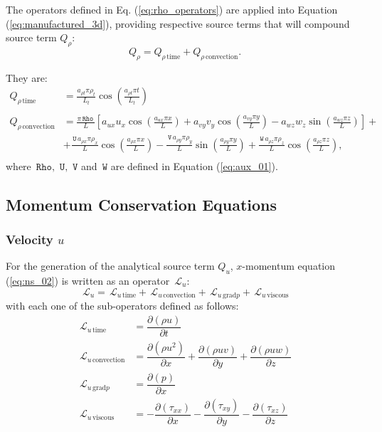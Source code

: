 \documentclass[10pt]{article}
\newcommand{\Diff}[2] {\dfrac{\partial( #1)}{\partial #2}}
\newcommand{\Rho}{\,\mathtt{Rho}}
\newcommand{\U}{\,\mathtt{U}}
\newcommand{\V}{\,\mathtt{V}}
\newcommand{\W}{\,\mathtt{W}}
\newcommand{\Lo}{\,\mathcal{L}}
\newcommand{\convection}{\text{convection}}
\newcommand{\gradp}{\text{grad}p}
\newcommand{\viscous}{\text{viscous}}
\begin{document}
The operators defined in Eq. (\ref{eq:rho_operators}) are applied into Equation  (\ref{eq:manufactured_3d}), providing respective source terms that will compound source term $Q_{\rho}$:
\begin{equation*}
 Q_{\rho} = Q_{\rho \, \text{time}}+Q_{\rho \, \text{convection}}.
\end{equation*}


They are:
\begin{equation*}
 \begin{split}
 Q_{\rho \, \text{time}}&= 
\frac{  a_{\rho t} \pi\rho_{t} }{L_t} \cos\left(\frac{a_{\rho t} \pi t}{L_t}\right) \\
%
&\\
%
 Q_{\rho \, \text{convection}}&= 
\frac{\pi \Rho \, }{L} \left[a_{ux} u_{x} \cos\left(\frac{a_{ux} \pi x}{L}\right) + a_{vy} v_{y} \cos\left(\frac{a_{vy} \pi y}{L}\right) - a_{wz} w_{z} \sin\left(\frac{a_{wz} \pi z}{L}\right)\right] + \\ 
&+ \frac{ \U \, a_{\rho x} \pi\rho_{x} }{L}\cos\left(\frac{a_{\rho x} \pi x}{L}\right)  - \frac{ \V \, a_{\rho y} \pi\rho_{y} }{L}\sin\left(\frac{a_{\rho y} \pi y}{L}\right)+ \frac{ \W \, a_{\rho z} \pi\rho_{z} }{L}\cos\left(\frac{a_{\rho z} \pi z}{L}\right),\\
 \end{split}
\end{equation*}
where $\Rho,\,\U,\,\V$ and $\W$  are defined in Equation (\ref{eq:aux_01}).


\subsection{Momentum Conservation Equations}

\subsubsection{Velocity $u$}
For the generation of the analytical source term $Q_u$, $x$-momentum equation (\ref{eq:ns_02}) is written as an operator $\Lo_u$:
 $$\Lo_u = \Lo_{u \, \text{time}}+\Lo_{u \, \convection}+\Lo_{u \, \gradp }+\Lo_{u \, \viscous }$$
with each one of the sub-operators defined as follows:
\begin{equation*}
 \begin{split}
\Lo_{u \, \text{time}}&= \Diff{\rho u}{t} \\
\Lo_{u \, \convection}&= \Diff{\rho u^2 }{x}+\Diff{\rho uv}{y} +\Diff{\rho uw}{z}\\
\Lo_{u \, \gradp }&= \Diff{p}{x}\\
\Lo_{u \, \viscous }&= -\Diff{\tau_{xx}}{x}-\Diff{\tau_{xy}}{y}-\Diff{\tau_{xz}}{z}
 \end{split}
\end{equation*}
\end{document}
